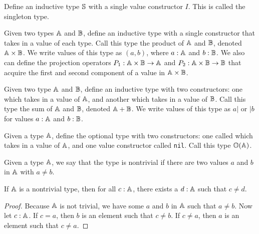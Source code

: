 \documentclass[../../math.tex]{subfiles}
\begin{document}
\begin{definition}
    Define an inductive type $\S$ with a single value constructor $I$.  This is
    called the singleton type.
\end{definition}

\begin{definition}
    Given two types $\A$ and $\B$, define an inductive type with a single
    constructor that takes in a value of each type.  Call this type the product
    of $\A$ and $\B$, denoted $\A \times \B$.  We write values of this type as
    $(a, b)$, where $a : \A$ and $b : \B$.  We also can define the projection
    operators $P_1 : \A \times \B \rightarrow \A$ and $P_2 : \A \times \B
    \rightarrow \B$ that acquire the first and second component of a value in
    $\A \times \B$.
\end{definition}

\begin{definition}
    Given two type $\A$ and $\B$, define an inductive type with two
    constructors: one which takes in a value of $\A$, and another which takes in
    a value of $\B$.  Call this type the sum of $\A$ and $\B$, denoted $\A +
    \B$.  We write values of this type as $a|$ or $|b$ for values $a : \A$ and
    $b : \B$.
\end{definition}

\begin{definition}
    Given a type $\A$, define the optional type with two constructors: one
    called  which takes in a value of $\A$, and one value constructor
    called \verb|nil|.  Call this type $\O(\A)$.
\end{definition}

\begin{class}
    Given a type $\A$, we say that the type is nontrivial if there are two
    values $a$ and $b$ in $\A$ with $a \neq b$.
\end{class}

\begin{theorem} \label{not_trivial2}
    If $\A$ is a nontrivial type, then for all $c : \A$, there exists a $d : \A$
    such that $c \neq d$.
\end{theorem}
\begin{proof}
    Because $\A$ is not trivial, we have some $a$ and $b$ in $\A$ such that $a
    \neq b$.  Now let $c : \A$.  If $c = a$, then $b$ is an element such that $c
    \neq b$.  If $c \neq a$, then $a$ is an element such that $c \neq a$.
\end{proof}
\end{document}
